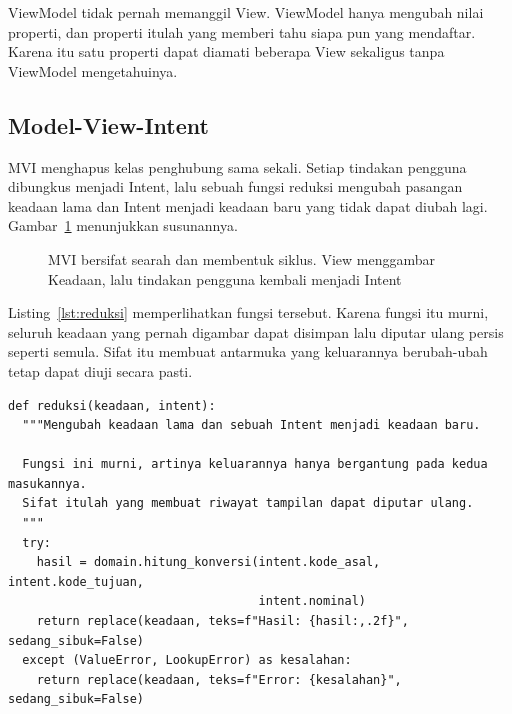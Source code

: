 ViewModel tidak pernah memanggil View. ViewModel hanya mengubah nilai properti,
dan properti itulah yang memberi tahu siapa pun yang mendaftar. Karena itu satu
properti dapat diamati beberapa View sekaligus tanpa ViewModel mengetahuinya.

\subsection{Model-View-Intent}

MVI menghapus kelas penghubung sama sekali. Setiap tindakan pengguna dibungkus
menjadi Intent, lalu sebuah fungsi reduksi mengubah pasangan keadaan lama dan
Intent menjadi keadaan baru yang tidak dapat diubah lagi.
Gambar~\ref{fig:mvi} menunjukkan susunannya.

\begin{figure}[htbp]
  \centering
  \caption{MVI bersifat searah dan membentuk siklus. View menggambar Keadaan,
    lalu tindakan pengguna kembali menjadi Intent}
  \label{fig:mvi}
\end{figure}

Listing~\ref{lst:reduksi} memperlihatkan fungsi tersebut. Karena fungsi itu
murni, seluruh keadaan yang pernah digambar dapat disimpan lalu diputar ulang
persis seperti semula. Sifat itu membuat antarmuka yang keluarannya
berubah-ubah tetap dapat diuji secara pasti.

\begin{lstlisting}[style=PythonStyle, caption={Fungsi reduksi pada MVI,
  tersedia di \berkas{sources/chapter03/mvi.py}}, label=lst:reduksi]
def reduksi(keadaan, intent):
  """Mengubah keadaan lama dan sebuah Intent menjadi keadaan baru.

  Fungsi ini murni, artinya keluarannya hanya bergantung pada kedua masukannya.
  Sifat itulah yang membuat riwayat tampilan dapat diputar ulang.
  """
  try:
    hasil = domain.hitung_konversi(intent.kode_asal, intent.kode_tujuan,
                                   intent.nominal)
    return replace(keadaan, teks=f"Hasil: {hasil:,.2f}", sedang_sibuk=False)
  except (ValueError, LookupError) as kesalahan:
    return replace(keadaan, teks=f"Error: {kesalahan}", sedang_sibuk=False)
\end{lstlisting}

